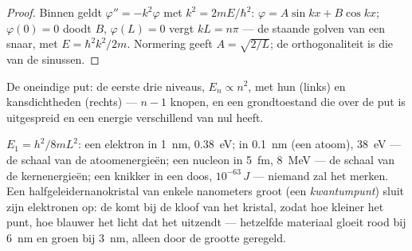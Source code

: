 \begin{proof}
Binnen geldt $\varphi'' = -k^2\varphi$ met $k^2 = 2mE/\hbar^2$:
$\varphi = A\sin kx
+ B\cos kx$; $\varphi(0) = 0$ doodt $B$,
$\varphi(L) = 0$ vergt $kL = n\pi$
--- de staande golven van een snaar, met $E = \hbar^2k^2/2m$.
Normering geeft $A = \sqrt{2/L}$; de orthogonaliteit is die van de
sinussen.
\end{proof}

\begin{omfigure}

{\small De oneindige put: de eerste drie niveaus, $E_n \propto n^2$,
met hun  (links) en kansdichtheden (rechts) ---
$n - 1$ knopen, en een grondtoestand die over de put is uitgespreid en
een energie verschillend van nul heeft.}
\end{omfigure}

\begin{example}\label{ex:b2:potential-wells-tunneling:orders}
$E_1 = h^2/8mL^2$: een elektron in \qty{1}{nm}, \qty{0.38}{eV}; in
\qty{0.1}{nm} (een atoom), \qty{38}{eV} --- de schaal van de atoomenergieën; een
nucleon in \qty{5}{fm}, \qty{8}{MeV} --- de schaal van de kernenergieën; een
knikker in een doos, $10^{-63}\,\unit{J}$ --- niemand zal het merken. Een
halfgeleidernanokristal van enkele nanometers groot (een \emph{kwantumpunt})
sluit zijn elektronen op: de  komt bij de
kloof van het kristal, zodat hoe kleiner het punt, hoe blauwer het licht dat
het uitzendt ---
hetzelfde materiaal gloeit rood bij \qty{6}{nm} en groen bij \qty{3}{nm},
alleen door de grootte geregeld.
\end{example}

